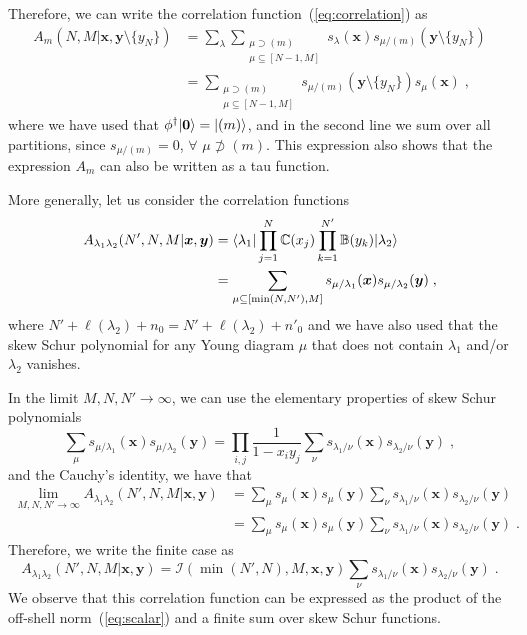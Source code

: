 \documentclass[a4paper,11pt]{amsart}
\begin{document}
Therefore, we can write the correlation function~(\ref{eq:correlation}) as 
\begin{equation}
\begin{split}
  A_m(N, M|\bm{x}, \bm{y}\setminus \{y_N\})
  & = \sum_\lambda \sum_{\substack{\mu \supset (m)\\ \mu \subseteq [N-1, M]}}
  s_{\lambda}(\bm{x}) s_{\mu/(m)}(\bm{y}\setminus\{y_N\})\\
  & = \sum_{\substack{\mu \supset (m)\\ \mu \subseteq [N-1, M]}}
  s_{\mu/(m)}(\bm{y}\setminus\{y_N\}) s_{\mu}(\bm{x})\; ,
\end{split}
\end{equation}
where we have used that \(\phi^\dagger \lvert\bm{0}\rangle = \lvert(m)\rangle\), and in the second line
we sum over all partitions, since \(s_{\mu/(m)} = 0\), \(\forall \) \(\mu \not \supset (m)\).
This expression also shows that the expression \(A_m\) can also be written as a tau function. 

More generally, let us consider the correlation functions 
\begin{equation}
\begin{split}
  A_{\lambda_1 \lambda_2}(N', N, M|\bm{x}, \bm{y}) & =
  \langle\lambda_1\rvert \prod_{j=1}^N \mathbb{C}(x_j)
  \prod_{k=1}^{N'} \mathbb{B}(y_k)\lvert\lambda_2\rangle \\
  & = \sum_{\mu \subseteq [\min(N, N'), M]} s_{\mu/\lambda_1}(\bm{x}) s_{\mu/\lambda_2}(\bm{y}) \; ,
\end{split}
\end{equation}
where \(N' + \ell(\lambda_2) + n_0 = N' + \ell(\lambda_2) + n'_0\) and
we have also used that the skew Schur polynomial for any Young diagram
\(\mu\) that does not contain \(\lambda_1\) and/or \(\lambda_2\)
vanishes.

In the limit \(M, N, N' \to \infty\), we can use the elementary
properties of skew Schur polynomials~\cite{Macdonald:1998}
\begin{equation}
  \sum_{\mu} s_{\mu/\lambda_1}(\bm{x}) s_{\mu/\lambda_2}(\bm{y}) = \prod_{i,j}\frac{1}{1 - x_i y_j}
 \sum_\nu s_{\lambda_1/\nu}(\bm{x}) s_{\lambda_2/\nu}(\bm{y})\; ,
\end{equation}
and the Cauchy's identity, we have that  
\begin{equation}
\begin{split}
  \lim_{M, N, N'\to \infty} A_{\lambda_1 \lambda_2}(N', N, M|\bm{x}, \bm{y})
  & = \sum_\mu s_{\mu}(\bm{x}) s_{\mu}(\bm{y})
 \sum_\nu s_{\lambda_1/\nu}(\bm{x}) s_{\lambda_2/\nu}(\bm{y})\\ 
  & = \sum_\mu s_{\mu}(\bm{x}) s_{\mu}(\bm{y})
 \sum_\nu s_{\lambda_1/\nu}(\bm{x}) s_{\lambda_2/\nu}(\bm{y})\; .
\end{split}
\end{equation}
Therefore, we write the finite case as
\begin{equation}
  A_{\lambda_1 \lambda_2}(N', N, M|\bm{x}, \bm{y})
  = \mathcal{I}(\min(N',N),M, \bm{x}, \bm{y})
  \sum_\nu s_{\lambda_1/\nu}(\bm{x}) s_{\lambda_2/\nu}(\bm{y})\; .
\end{equation}
We observe that this correlation function can be expressed as the
product of the off-shell norm~(\ref{eq:scalar}) and a finite sum over
skew Schur functions.
\end{document}
